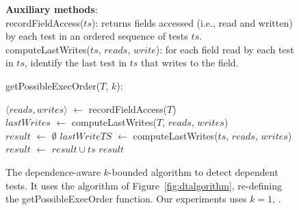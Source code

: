 \begin{figure}[t]
\textbf{Auxiliary methods}:\\
recordFieldAccess($ts$): returns fields accessed (i.e., read and written) by each test in an ordered sequence of tests $ts$. \\
computeLastWrites($ts$, $reads$, $write$): for each field read by each test in $ts$, identify the last test in $ts$ that writes to the field.\\

\vspace{-2mm}

getPossibleExecOrder($T$, $k$):\\
\vspace{-5mm}
\begin{algorithmic}[1]
\STATE $\langle reads, writes\rangle$ $\leftarrow$ recordFieldAccess($T$)\\
\STATE $\mathit{lastWrites}$ $\leftarrow$ computeLastWrites($T$, $\mathit{reads}$, $\mathit{writes}$)
\\
\STATE $\mathit{result}$ $\leftarrow$ $\emptyset$
\STATE $\mathit{lastWriteTS}$ $\leftarrow$ computeLastWrites($ts$, $\mathit{reads}$, $\mathit{writes}$)
\vspace{-3mm}
\STATE $\mathit{result}$ $\leftarrow$ $\mathit{result} \cup \mathit{ts}$
\ENDIF
\ENDFOR
\RETURN $\mathit{result}$
\end{algorithmic}

\vspace{-3mm}
\caption {The dependence-aware $k$-bounded algorithm to detect dependent tests.
It uses the algorithm of Figure~\ref{fig:dtalgorithm}, re-defining the
getPossibleExecOrder function.
Our experiments uses $k=1$, . } 
\label{fig:impralg}
\end{figure}

